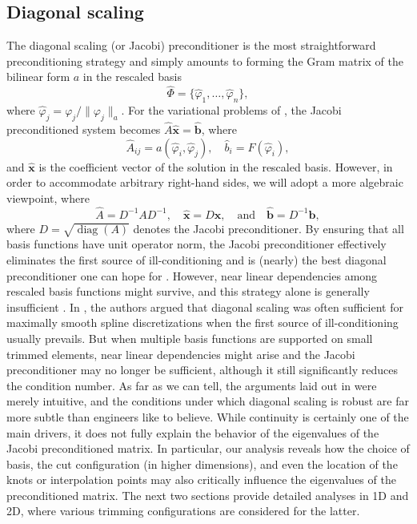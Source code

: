 \documentclass{article}
\numberwithin{equation}{section}
\DeclareMathOperator{\diag}{\operatorname{diag}}
\theoremstyle{definition}
\begin{document}
\subsection{Diagonal scaling}
\label{se: diagonal_scaling}
The diagonal scaling (or Jacobi) preconditioner is the most straightforward preconditioning strategy and simply amounts to forming the Gram matrix of the bilinear form $a$ in the rescaled basis
\begin{equation*}
    \hat{\Phi} = \{\hat{\varphi}_1,\dots,\hat{\varphi}_n\},
\end{equation*}
where $\hat{\varphi}_j=\varphi_j/\|\varphi_j\|_a$. For the variational problems of , the Jacobi preconditioned system becomes $\hat{A}\hat{\bm{x}}=\hat{\bm{b}}$, where
\begin{equation*}
    \hat{A}_{ij} = a(\hat{\varphi}_i,\hat{\varphi}_j), \quad \hat{b}_i = F(\hat{\varphi}_i),
\end{equation*}
and $\hat{\bm{x}}$ is the coefficient vector of the solution in the rescaled basis. However, in order to accommodate arbitrary right-hand sides, we will adopt a more algebraic viewpoint, where
\begin{equation*}
    \hat{A}=D^{-1}AD^{-1}, \quad \hat{\bm{x}}=D\bm{x}, \quad \text{and} \quad \hat{\bm{b}}=D^{-1}\bm{b},
\end{equation*}
where $D=\sqrt{\diag(A)}$ denotes the Jacobi preconditioner. By ensuring that all basis functions have unit operator norm, the Jacobi preconditioner effectively eliminates the first source of ill-conditioning and is (nearly) the best diagonal preconditioner one can hope for \cite{van1969condition}. However, near linear dependencies among rescaled basis functions might survive, and this strategy alone is generally insufficient \cite{de2017condition}. In \cite{de2017condition,de2023stability}, the authors argued that diagonal scaling was often sufficient for maximally smooth spline discretizations when the first source of ill-conditioning usually prevails. But when multiple basis functions are supported on small trimmed elements, near linear dependencies might arise and the Jacobi preconditioner may no longer be sufficient, although it still significantly reduces the condition number. As far as we can tell, the arguments laid out in \cite{de2023stability} were merely intuitive, and the conditions under which diagonal scaling is robust are far more subtle than engineers like to believe. While continuity is certainly one of the main drivers, it does not fully explain the behavior of the eigenvalues of the Jacobi preconditioned matrix. In particular, our analysis reveals how the choice of basis, the cut configuration (in higher dimensions), and even the location of the knots or interpolation points may also critically influence the eigenvalues of the preconditioned matrix. The next two sections provide detailed analyses in 1D and 2D, where various trimming configurations are considered for the latter.
\end{document}
